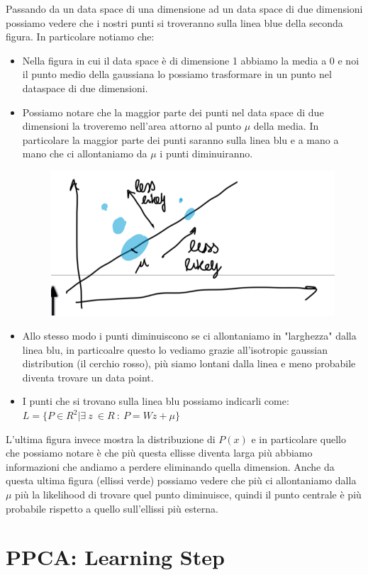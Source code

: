 \documentclass[14pt]{extreport}
\begin{document}
Passando da un data space di una dimensione ad un data space di due dimensioni possiamo vedere che i nostri punti si troveranno sulla linea blue della seconda figura.
In particolare notiamo che:
\begin{itemize}
	\item Nella figura in cui il data space è di dimensione 1 abbiamo la media a 0 e noi il punto medio della gaussiana lo possiamo trasformare in un punto 
	nel dataspace di due dimensioni. 
	\item Possiamo notare che la maggior parte dei punti nel data space di due dimensioni la troveremo nell'area attorno al punto $\mu$ della media.
	In particolare la maggior parte dei punti saranno sulla linea blu e a mano a mano che ci allontaniamo da $\mu$ i punti diminuiranno.
	\begin{figure}[H] 
	\centering
	\includegraphics[width=0.7\linewidth]{484.jpeg}
	\end{figure}
	\item Allo stesso modo i punti diminuiscono se ci allontaniamo in "larghezza" dalla linea blu, in particoalre questo lo vediamo grazie all'isotropic gaussian
	distribution (il cerchio rosso), più siamo lontani dalla linea e meno probabile diventa trovare un data point.
	\item I punti che si trovano sulla linea blu possiamo indicarli come:
	$L = \{P \in R^2 | \exists\ z\ \in R \ : \ P=Wz+\mu\}$
\end{itemize}

L'ultima figura invece mostra la distribuzione di $P(x)$ e in particolare quello che possiamo notare è che più questa ellisse diventa larga più abbiamo informazioni 
che andiamo a perdere eliminando quella dimension.
Anche da questa ultima figura (ellissi verde) possiamo vedere che più ci allontaniamo dalla $\mu$ più la likelihood di trovare quel punto diminuisce, quindi il punto
centrale è più probabile rispetto a quello sull'ellissi più esterna.

\section{PPCA: Learning Step}
\end{document}
